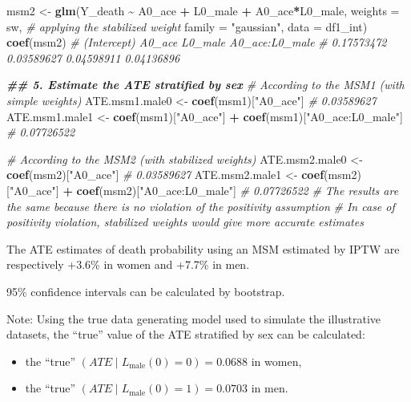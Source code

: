 \documentclass[
]{book}
\newenvironment{Shaded}{\begin{snugshade}}{\end{snugshade}}
\newcommand{\AttributeTok}[1]{\textcolor[rgb]{0.13,0.29,0.53}{#1}}
\newcommand{\CommentTok}[1]{\textcolor[rgb]{0.56,0.35,0.01}{\textit{#1}}}
\newcommand{\DocumentationTok}[1]{\textcolor[rgb]{0.56,0.35,0.01}{\textbf{\textit{#1}}}}
\newcommand{\FunctionTok}[1]{\textcolor[rgb]{0.13,0.29,0.53}{\textbf{#1}}}
\newcommand{\NormalTok}[1]{#1}
\newcommand{\OtherTok}[1]{\textcolor[rgb]{0.56,0.35,0.01}{#1}}
\newcommand{\SpecialCharTok}[1]{\textcolor[rgb]{0.81,0.36,0.00}{\textbf{#1}}}
\newcommand{\StringTok}[1]{\textcolor[rgb]{0.31,0.60,0.02}{#1}}
\begin{document}
\begin{Shaded}
\begin{Highlighting}[]
\NormalTok{msm2 }\OtherTok{\textless{}{-}} \FunctionTok{glm}\NormalTok{(Y\_death }\SpecialCharTok{\textasciitilde{}}\NormalTok{ A0\_ace }\SpecialCharTok{+}\NormalTok{ L0\_male }\SpecialCharTok{+}\NormalTok{ A0\_ace}\SpecialCharTok{*}\NormalTok{L0\_male,}
            \AttributeTok{weights =}\NormalTok{ sw, }\CommentTok{\# applying the stabilized weight}
            \AttributeTok{family =} \StringTok{"gaussian"}\NormalTok{,}
            \AttributeTok{data =}\NormalTok{ df1\_int)}
\FunctionTok{coef}\NormalTok{(msm2)}
\CommentTok{\# (Intercept)         A0\_ace        L0\_male A0\_ace:L0\_male}
\CommentTok{\# 0.17573472     0.03589627     0.04598911     0.04136896}

\DocumentationTok{\#\# 5. Estimate the ATE stratified by sex}
\CommentTok{\# According to the MSM1 (with simple weights)}
\NormalTok{ATE.msm1.male0 }\OtherTok{\textless{}{-}} \FunctionTok{coef}\NormalTok{(msm1)[}\StringTok{"A0\_ace"}\NormalTok{]}
\CommentTok{\# 0.03589627}
\NormalTok{ATE.msm1.male1 }\OtherTok{\textless{}{-}} \FunctionTok{coef}\NormalTok{(msm1)[}\StringTok{"A0\_ace"}\NormalTok{] }\SpecialCharTok{+} \FunctionTok{coef}\NormalTok{(msm1)[}\StringTok{"A0\_ace:L0\_male"}\NormalTok{]}
\CommentTok{\# 0.07726522}

\CommentTok{\# According to the MSM2 (with stabilized weights)}
\NormalTok{ATE.msm2.male0 }\OtherTok{\textless{}{-}} \FunctionTok{coef}\NormalTok{(msm2)[}\StringTok{"A0\_ace"}\NormalTok{]}
\CommentTok{\# 0.03589627}
\NormalTok{ATE.msm2.male1 }\OtherTok{\textless{}{-}} \FunctionTok{coef}\NormalTok{(msm2)[}\StringTok{"A0\_ace"}\NormalTok{] }\SpecialCharTok{+} \FunctionTok{coef}\NormalTok{(msm2)[}\StringTok{"A0\_ace:L0\_male"}\NormalTok{]}
\CommentTok{\# 0.07726522}
\CommentTok{\# The results are the same because there is no violation of the positivity assumption}
\CommentTok{\# In case of positivity violation, stabilized weights would give more accurate estimates}
\end{Highlighting}
\end{Shaded}

The ATE estimates of death probability using an MSM estimated by IPTW are respectively +3.6\% in women and +7.7\% in men.

95\% confidence intervals can be calculated by bootstrap.

Note: Using the true data generating model used to simulate the illustrative datasets, the ``true'' value of the ATE stratified by sex can be calculated:

\begin{itemize}
\item
  the ``true'' \((ATE \mid L_\text{male}(0) = 0) = 0.0688\) in women,
\item
  the ``true'' \((ATE \mid L_\text{male}(0) = 1) = 0.0703\) in men.
\end{itemize}
\end{document}

